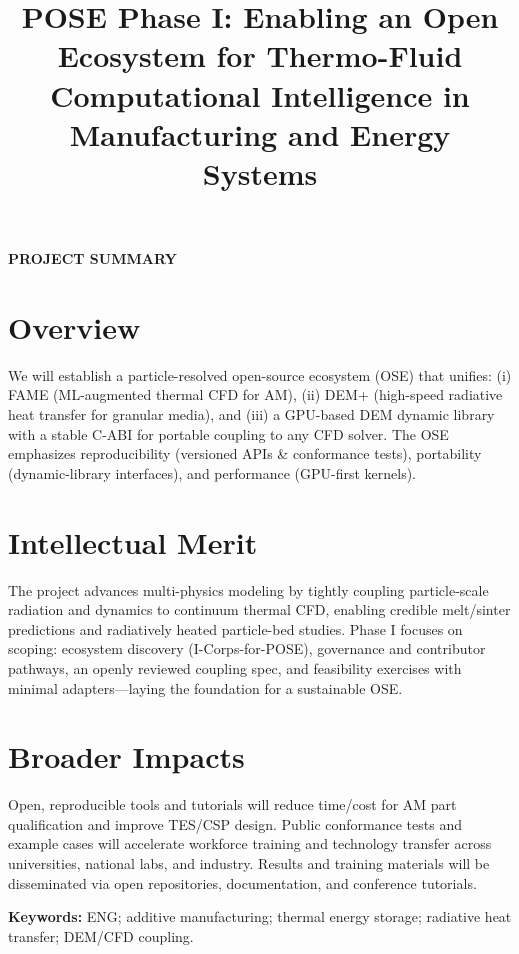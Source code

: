 \documentclass[11pt]{article}
\title{
    \vspace{-45pt}
    \fontsize{15pt}{18pt}\selectfont
    \textcolor{FlyersRed}
    {\textbf{POSE Phase I}: Enabling an Open Ecosystem for Thermo-Fluid Computational Intelligence in Manufacturing and Energy Systems}
}
\date{}
\author{}
\begin{document}
\newpage
\begin{center}
    \Large\textbf{\textcolor{FlyersRed}{PROJECT SUMMARY}}
\end{center}
\vspace{-3pt}
\section*{Overview}
\noindent
 We will establish a particle-resolved open-source ecosystem (OSE) that unifies: (i) FAME (ML-augmented thermal CFD for AM), (ii) DEM+ (high-speed radiative heat transfer for granular media), and (iii) a GPU-based DEM dynamic library with a stable C-ABI for portable coupling to any CFD solver. The OSE emphasizes reproducibility (versioned APIs \& conformance tests), portability (dynamic-library interfaces), and performance (GPU-first kernels).
\section*{Intellectual Merit}
\noindent
The project advances multi-physics modeling by tightly coupling particle-scale radiation and dynamics to continuum thermal CFD, enabling credible melt/sinter predictions and radiatively heated particle-bed studies. Phase I focuses on scoping: ecosystem discovery (I-Corps-for-POSE), governance and contributor pathways, an openly reviewed coupling spec, and feasibility exercises with minimal adapters—laying the foundation for a sustainable OSE.
\section*{Broader Impacts}
\noindent
Open, reproducible tools and tutorials will reduce time/cost for AM part qualification and improve TES/CSP design. Public conformance tests and example cases will accelerate workforce training and technology transfer across universities, national labs, and industry. Results and training materials will be disseminated via open repositories, documentation, and conference tutorials.

\textbf{Keywords:} ENG; additive manufacturing; thermal energy storage; radiative heat transfer; DEM/CFD coupling.
\vspace{-3pt}
\pagestyle{empty} %
\maketitle
{} %
\end{document}
